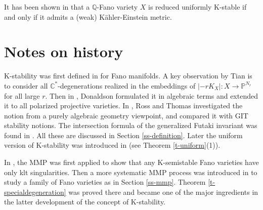 \documentclass[12pt,reqno]{amsart}%
\theoremstyle{definition}
\theoremstyle{remark}
\newcommand{\bQ}{{\mathbb{Q}}}
\begin{document}
 
It has been shown in \cite{Li19} that a $\bQ$-Fano variety $X$ is reduced uniformly K-stable if and only if it admits a (weak) K\"ahler-Einstein metric. 


\section*{Notes on history}

 K-stability was first defined in \cite{Tia97} for Fano manifolds. A key observation by Tian is to consider all $\mathbb C^*$-degenerations realized in the embeddings of $|-rK_X|\colon X\to\mathbb P^{N_r} $ for all large $r$. Then in \cite{Don02}, Donaldson formulated it in algebraic terms and extended it to all polarized projective varieties. In \cite{RT07},  Ross and Thomas investigated the notion from a purely algebraic geometry viewpoint, and compared it with GIT stability notions. The intersection formula of the generalized Futaki invariant was found in \cite{Wan12, Oda13b}. All these are discussed in Section \ref{ss-definition}. Later the uniform version of K-stability was introduced in \cite{BHJ17,Der16} (see Theorem \ref{t-uniform}(1)).

 In \cite{Oda13}, the MMP was first applied to show that any K-semistable Fano varieties have only klt singularities. Then a more systematic MMP process was introduced in \cite{LX14} to study a family of Fano varieties as in Section \ref{ss-mmp}. Theorem \ref{t-specialdegeneration} was proved there and became one of the major ingredients in the latter development of the concept of K-stability. 
 
\end{document}
